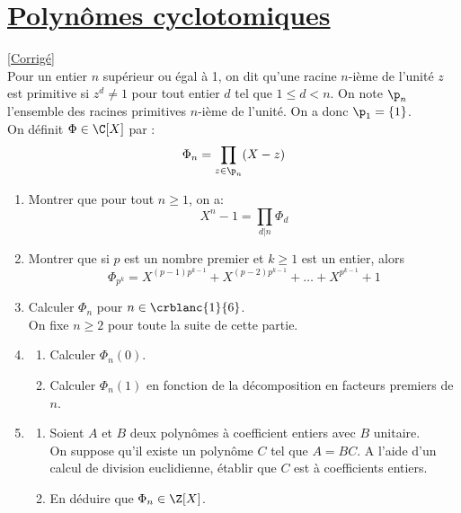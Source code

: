 \documentclass{book}
\begin{document}
	\section{\underline{Polynômes cyclotomiques} }
	\textcolor{blue}{\hyperref[sec:polynomes-cyclotomiques]{[Corrigé]}}\\
	\label{Polynômes cyclotomiques}
	Pour un entier $n$ supérieur ou égal à 1, on dit qu'une racine $n$-ième de l'unité $z$ est primitive si $z^d\ne 1$ pour tout entier $d$ tel que $1\leq d<n$. On note $\p_n$ l'ensemble des racines primitives $n$-ième de l'unité. On a donc $\p_1=\{1\}$.
	\\On définit $\Phi\in\C[X]$ par : $$\Phi_n=\displaystyle\prod\limits_{z\in\p_n} (X-z)$$
	\begin{enumerate}[leftmargin=*]
		\item Montrer que pour tout $n\geq1$, on a: $$X^n-1=\displaystyle\prod\limits_{d|n}\Phi_d$$
		\item Montrer que si $p$ est un nombre premier et $k\geq1$ est un entier, alors $$\Phi_{p^k}=X^{(p-1)p^{k-1}}+X^{(p-2)p^{k-1}}+\dots+X^{p^{k-1}}+1$$
		\item Calculer $\Phi_n$ pour $n\in\crblanc{1}{6}$.\\
		On fixe $n\geq2$ pour toute la suite de cette partie.
		\item \begin{enumerate}[label=\alph*.]
			\item Calculer $\Phi_n(0)$.
			\item Calculer $\Phi_n(1)$ en fonction de la décomposition en facteurs premiers de $n$.
		\end{enumerate}
		\item \begin{enumerate}[label=\alph*.]
			\item Soient $A$ et $B$ deux polynômes à coefficient entiers avec $B$ unitaire.
			\\On suppose qu'il existe un polynôme $C$ tel que $A=BC$. A l'aide d'un calcul de division euclidienne, établir que $C$ est à coefficients entiers.
			\item En déduire que $\Phi_n\in\Z[X]$. 
		\end{enumerate}
	\end{enumerate}
	
\end{document}
